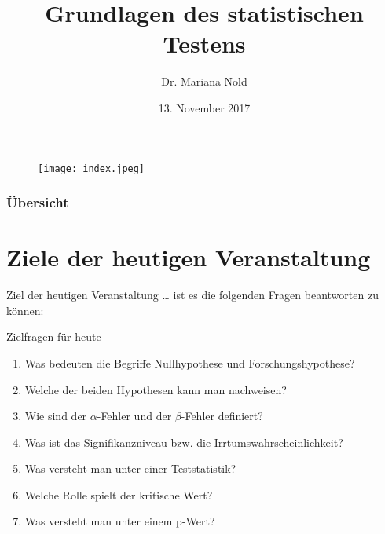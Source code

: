 \documentclass[usenames,dvipsnames,handout]{beamer}
\begin{document}
\author[Dr. Mariana Nold]{Dr. Mariana Nold}
 \date{}
\title [Grundlagen des statistischen Testens]{Grundlagen des statistischen Testens}
\date{13. November 2017}
\begin{frame}
\maketitle

  \begin{figure}[ht]
 	\centering
 	      \texttt{[image: index.jpeg]}
 	\end{figure}
\end{frame} 

\begin{frame}
  \frametitle{Übersicht}
  \tableofcontents
\end{frame}

\section{Ziele der heutigen Veranstaltung }
\begin{frame}{Ziel der heutigen Veranstaltung \dots}
ist es die folgenden Fragen beantworten zu können:
\begin{block}{Zielfragen für heute}
\begin{enumerate}
\item{Was bedeuten die Begriffe Nullhypothese und Forschungshypothese?}
\item{Welche der beiden Hypothesen kann man nachweisen?}
\item{Wie sind der $\alpha$-Fehler und der $\beta$-Fehler definiert?}
\item{Was ist das Signifikanzniveau bzw. die Irrtumswahrscheinlichkeit?}
\item{Was versteht man unter einer Teststatistik?}
\item{Welche Rolle spielt der kritische Wert?}
\item{Was versteht man unter einem p-Wert?}
\end{enumerate}
\end{block}
\end{frame}
\end{document}
